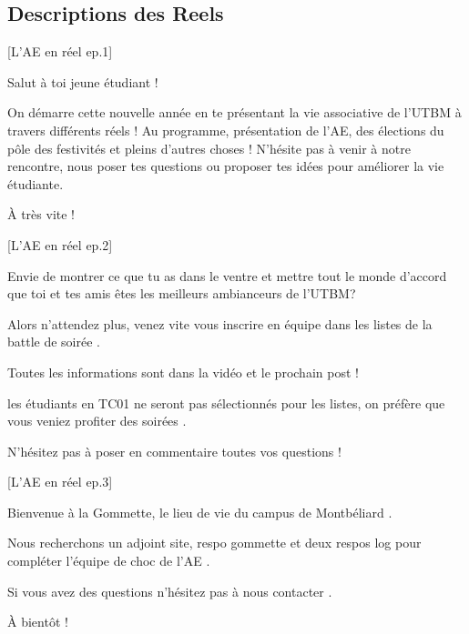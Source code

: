 


\subsection*{Descriptions des Reels}\label{subsec:descriptions-reels}



[L'\gls{AE} en réel ep.1]

\noindent Salut à toi jeune étudiant !

\noindent On démarre cette nouvelle année en te présentant la vie associative de l'\gls{UTBM} à travers différents réels !
\noindent Au programme, présentation de l'\gls{AE}, des élections du pôle des festivités et pleins d'autres choses !
\noindent N'hésite pas à venir à notre rencontre, nous poser tes questions ou proposer tes idées pour améliorer la vie étudiante.

\noindent À très vite !


[L'\gls{AE} en réel ep.2]

\noindent Envie de montrer ce que tu as dans le ventre et mettre tout le monde d'accord que toi et tes amis êtes les meilleurs ambianceurs de l'\gls{UTBM}? 

\noindent Alors n'attendez plus, venez vite vous inscrire en équipe dans les listes de la battle de soirée .

\noindent Toutes les informations sont dans la vidéo et le prochain post  !

\noindent {} les étudiants en TC01 ne seront pas sélectionnés pour les listes, on préfère que vous veniez profiter des soirées .

\noindent N'hésitez pas à poser en commentaire toutes vos questions !


[L'\gls{AE} en réel ep.3]

\noindent Bienvenue à la Gommette, le lieu de vie du campus de Montbéliard .

\noindent Nous recherchons un adjoint site, respo gommette et deux respos log pour compléter l'équipe de choc de l'\gls{AE} .

\noindent Si vous avez des questions n'hésitez pas à nous contacter .

\noindent À bientôt  !





